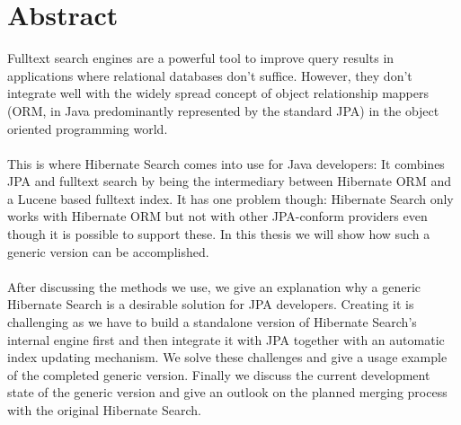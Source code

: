 \section*{Abstract}

Fulltext search engines are a powerful tool to improve query results in applications where relational databases don't suffice. However, they don't integrate well with the widely spread concept of object relationship mappers (ORM, in Java predominantly represented by the standard JPA) in the object oriented programming world.
\\\\
This is where Hibernate Search comes into use for Java developers: It combines JPA and fulltext search by being the intermediary between Hibernate ORM and a Lucene based fulltext index. It has one problem though: Hibernate Search only works with Hibernate ORM but not with other JPA-conform providers even though it is possible to support these. In this thesis we will show how such a generic version can be accomplished.
\\\\
After discussing the methods we use, we give an explanation why a generic Hibernate Search is a desirable solution for JPA developers. Creating it is challenging as we have to build a standalone version of Hibernate Search's internal engine first and then integrate it with JPA together with an automatic index updating mechanism. We solve these challenges and give a usage example of the completed generic version. Finally we discuss the current development state of the generic version and give an outlook on the planned merging process with the original Hibernate Search.

\pagebreak

